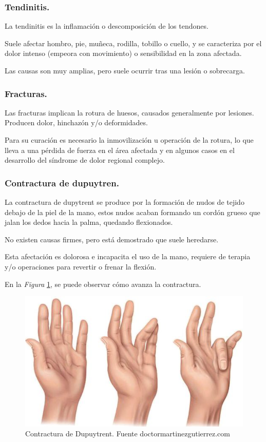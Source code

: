 \subsubsection{Tendinitis.}
La tendinitis es la inflamación o descomposición de los tendones.\cite{tendinitis-1}

Suele afectar hombro, pie, muñeca, rodilla, tobillo o cuello, y se caracteriza por el dolor intenso (empeora con movimiento) o sensibilidad en la zona afectada. \cite{tendinitis}

Las causas son muy amplias, pero suele ocurrir tras una lesión o sobrecarga.\cite{tendinitis-1}
\subsubsection{Fracturas.}

Las fracturas implican la rotura de huesos, causados generalmente por lesiones. Producen dolor, hinchazón y/o deformidades.

Para su curación es necesario la inmovilización u operación de la rotura, lo que lleva a una pérdida de fuerza en el área afectada y en algunos casos en el desarrollo del síndrome de dolor regional complejo.\cite{fracturas}
\subsubsection{Contractura de dupuytren.}

La contractura de dupytrent se produce por la formación de nudos de tejido debajo de la piel de la mano, estos nudos acaban formando un cordón grueso que jalan los dedos hacia la palma, quedando flexionados.  \cite{contractura_Dupuytren-1}

No existen causas firmes, pero está demostrado que suele heredarse. 

Esta afectación es dolorosa e incapacita el uso de la mano, requiere de terapia y/o operaciones para revertir o frenar la flexión. \cite{contractura_Dupuytren-1}

En la \textit{Figura} \ref{fig:Dupuytrent}, se puede observar cómo avanza la contractura.

\begin{figure}
    \centering
    \includegraphics[width=0.5\linewidth]{img/Dupuytrent.png}
    \caption{Contractura de Dupuytrent. Fuente doctormartinezgutierrez.com}
    \label{fig:Dupuytrent}
\end{figure}

